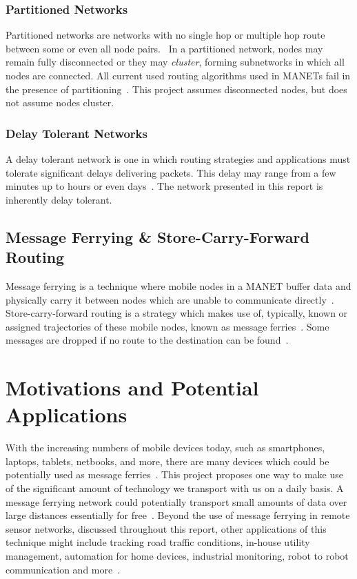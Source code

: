 \subsubsection{Partitioned Networks}
\label{sec:clustering}
Partitioned networks are networks with no single hop or multiple hop route between some or even all node pairs.~\cite{hybrid}
In a partitioned network, nodes may remain fully disconnected or they may \emph{cluster}, forming subnetworks in which all nodes are connected.
All current used routing algorithms used in MANETs %
fail in the presence of partitioning~\cite{Routing}.
This project assumes disconnected nodes, but does not assume nodes cluster.

\subsubsection{Delay Tolerant Networks}
\label{sec:delay_loss_tolerant}
A delay tolerant network is one in which routing strategies and applications must tolerate significant delays delivering packets.
This delay may range from a few minutes up to hours or even days~\cite{Routing}.
The network presented in this report is inherently delay tolerant.

\subsection{Message Ferrying \& Store-Carry-Forward Routing}
\label{sec:ferrying_overview}
Message ferrying is a technique where mobile nodes in a MANET buffer data and physically carry it between nodes which are unable to communicate directly~\cite{adhocmsgferry}.
Store-carry-forward routing is a strategy which makes use of, typically, known or assigned trajectories of these mobile nodes, known as message ferries~\cite{Routing}.
Some messages are dropped if no route to the destination can be found~\cite{implement}.

\section{Motivations and Potential Applications}
\label{sec:motivations}

With the increasing numbers of mobile devices today, such as smartphones, laptops, tablets, netbooks, and more, there are many devices which could be potentially used as message ferries~\cite{wearable}.
This project proposes one way to make use of the significant amount of technology we transport with us on a daily basis.
A message ferrying network could potentially transport small amounts of data over large distances essentially for free~\cite{efficientrouting}.
Beyond the use of message ferrying in remote sensor networks, discussed throughout this report, other applications of this technique might include tracking road traffic conditions, in-house utility management, automation for home devices, industrial monitoring, robot to robot communication and more~\cite{book1}.


